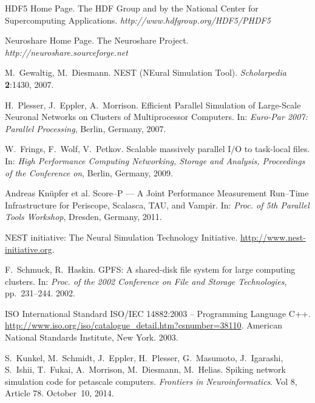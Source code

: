 \documentclass[]{YIC2015}
\begin{document}
\begin{thebibliography}{99}
HDF5 Home Page. The HDF Group and by the National Center for Supercomputing Applications. \textit{http://www.hdfgroup.org/HDF5/PHDF5}

Neuroshare Home Page. The Neuroshare Project. \textit{http://neuroshare.sourceforge.net}

M.~Gewaltig, M.~Diesmann. NEST (NEural Simulation Tool). \textit{Scholarpedia} %
\textbf{2}:1430, 2007.

H.~Plesser, J.~Eppler, A.~Morrison. Efficient Parallel Simulation of Large-Scale
                  Neuronal Networks on Clusters of Multiprocessor
                  Computers. In: \textit{Euro-Par 2007: Parallel Processing}, Berlin, Germany, 2007.

W.~Frings, F.~Wolf, V.~Petkov. Scalable massively parallel I/O to task-local files.
 In: \textit{High Performance Computing Networking, Storage and Analysis, Proceedings of the Conference on}, Berlin, Germany, 2009.

Andreas Kn\"upfer et al. Score--P --- A Joint Performance Measurement Run--Time Infrastructure for Periscope, Scalasca, TAU, and Vampir. In: \textit{Proc. of 5th Parallel Tools Workshop}, Dresden, Germany, 2011.

  NEST initiative: The Neural Simulation Technology Initiative. \url{http://www.nest-initiative.org}.

  F.~Schmuck, R.~Haskin. GPFS: A shared-disk file system for large computing clusters.
  In: \textit{Proc. of the 2002 Conference on File and Storage Technologies}, pp.~231--244. 2002.

  ISO International Standard ISO/IEC 14882:2003 -- Programming Language C++. 
  \url{http://www.iso.org/iso/catalogue_detail.htm?csnumber=38110}.
  American National Standards Institute, New York. 2003.

  S.~Kunkel, M.~Schmidt, J.~Eppler, H.~Plesser, G.~Masumoto, J.~Igarashi, S.~Ishii, T.~Fukai, A.~Morrison, M.~Diesmann, M.~Helias.
  Spiking network simulation code for petascale computers.
  \textit{Frontiers in Neuroinformatics}. Vol 8, Article 78. October~10, 2014.



\end{thebibliography}
\end{document}
